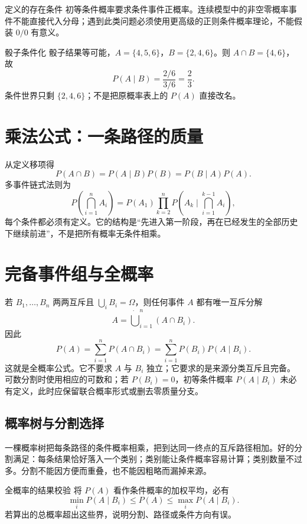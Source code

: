 \documentclass[11pt,a4paper]{ctexart}
\begin{document}
\begin{warnbox}{定义的存在条件}
初等条件概率要求条件事件正概率。连续模型中的非空零概率事件不能直接代入分母；遇到此类问题必须使用更高级的正则条件概率理论，不能假装 $0/0$ 有意义。
\end{warnbox}

\begin{examplebox}{骰子条件化}
骰子结果等可能，$A=\{4,5,6\}$，$B=\{2,4,6\}$。则 $A\cap B=\{4,6\}$，故
\[
P(A\mid B)=\frac{2/6}{3/6}=\frac23.
\]
条件世界只剩 $\{2,4,6\}$；不是把原概率表上的 $P(A)$ 直接改名。
\end{examplebox}

\section{乘法公式：一条路径的质量}

从定义移项得
\[
\boxed{P(A\cap B)=P(A\mid B)P(B)=P(B\mid A)P(A)}.
\]
多事件链式法则为
\[
\boxed{P\!\left(\bigcap_{i=1}^nA_i\right)=P(A_1)\prod_{k=2}^{n}P\!\left(A_k\mid\bigcap_{i=1}^{k-1}A_i\right)},
\]
每个条件都必须有定义。它的结构是“先进入第一阶段，再在已经发生的全部历史下继续前进”，不是把所有概率无条件相乘。

\section{完备事件组与全概率}

若 $B_1,\ldots,B_n$ 两两互斥且 $\bigcup_iB_i=\Omega$，则任何事件 $A$ 都有唯一互斥分解
\[
A=\mathbin{\dot\bigcup}_{i=1}^{n}(A\cap B_i).
\]
因此
\[
\boxed{P(A)=\sum_{i=1}^{n}P(A\cap B_i)=\sum_{i=1}^{n}P(B_i)P(A\mid B_i)}.
\]
这就是全概率公式。它不要求 $A$ 与 $B_i$ 独立；它要求的是来源分类互斥且完备。可数分割时使用相应的可数和；若 $P(B_i)=0$，初等条件概率 $P(A\mid B_i)$ 未必有定义，此时应保留联合概率形式或删去零质量分支。

\subsection{概率树与分割选择}

一棵概率树把每条路径的条件概率相乘，把到达同一终点的互斥路径相加。好的分割满足：每条结果恰好落入一个类别；类别能让条件概率容易计算；类别数量不过多。分割不能因方便而重叠，也不能因粗略而漏掉来源。

\begin{methodbox}{全概率的结果校验}
将 $P(A)$ 看作条件概率的加权平均，必有
\[
\min_iP(A\mid B_i)\le P(A)\le\max_iP(A\mid B_i).
\]
若算出的总概率超出这些界，说明分割、路径或条件方向有误。
\end{methodbox}
\end{document}

